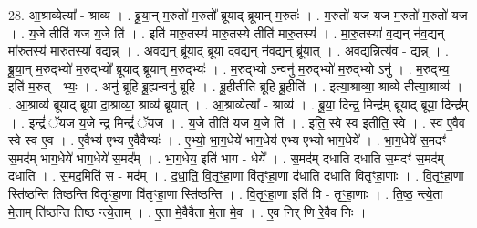 \documentclass[17pt]{extarticle}
\begin{document}
28. आ॒श्राव्येत्या᳚ - श्राव्य॑ । . ब्रू॒या॒न् म॒रुतो॑ म॒रुतो᳚ ब्रूयाद् ब्रूयान् म॒रुतः॑ । . म॒रुतो॑ यज यज म॒रुतो॑ म॒रुतो॑ यज । . य॒जे तीति॑ यज य॒जे ति॑ । . इति॑ मारु॒तस्य॑ मारु॒तस्ये तीति॑ मारु॒तस्य॑ । . मा॒रु॒तस्या॑ व॒द्यन् न॑व॒द्यन् मा॑रु॒तस्य॑ मारु॒तस्या॑ व॒द्यन्न् । . अ॒व॒द्यन् ब्रू॑याद् ब्रूया दव॒द्यन् न॑व॒द्यन् ब्रू॑यात् । . अ॒व॒द्यन्नित्य॑व - द्यन्न् । . ब्रू॒या॒न् म॒रुद्भ्यो॑ म॒रुद्भ्यो᳚ ब्रूयाद् ब्रूयान् म॒रुद्भ्यः॑ । . म॒रुद्भ्यो ऽन्वनु॑ म॒रुद्भ्यो॑ म॒रुद्भ्यो ऽनु॑ । . म॒रुद्भ्य॒ इति॑ म॒रुत् - भ्यः॒ । . अनु॑ ब्रूहि ब्रू॒ह्यन्वनु॑ ब्रूहि । . ब्रू॒हीतीति॑ ब्रूहि ब्रू॒हीति॑ । . इत्या॒श्राव्या॒ श्राव्ये तीत्या॒श्राव्य॑ । . आ॒श्राव्य॑ ब्रूयाद् ब्रूया दा॒श्राव्या॒ श्राव्य॑ ब्रूयात् । . आ॒श्राव्येत्या᳚ - श्राव्य॑ । . ब्रू॒या॒ दिन्द्र॒ मिन्द्र॑म् ब्रूयाद् ब्रूया॒ दिन्द्र᳚म् । . इन्द्रं॑ ॅयज य॒जे न्द्र॒ मिन्द्रं॑ ॅयज । . य॒जे तीति॑ यज य॒जे ति॑ । . इति॒ स्वे स्व इतीति॒ स्वे । . स्व ए॒वैव स्वे स्व ए॒व । . ए॒वैभ्य॑ एभ्य ए॒वैवैभ्यः॑ । . ए॒भ्यो॒ भा॒ग॒धेये॑ भाग॒धेय॑ एभ्य एभ्यो भाग॒धेये᳚ । . भा॒ग॒धेये॑ स॒मदꣳ॑ स॒मद॑म् भाग॒धेये॑ भाग॒धेये॑ स॒मद᳚म् । . भा॒ग॒धेय॒ इति॑ भाग - धेये᳚ । . स॒मद॑म् दधाति दधाति स॒मदꣳ॑ स॒मद॑म् दधाति । . स॒मद॒मिति॑ स - मद᳚म् । . द॒धा॒ति॒ वि॒तृꣳ॒॒हा॒णा वि॑तृꣳहा॒णा द॑धाति दधाति वितृꣳहा॒णाः । . वि॒तृꣳ॒॒हा॒णा स्ति॑ष्ठन्ति तिष्ठन्ति वितृꣳहा॒णा वि॑तृꣳहा॒णा स्ति॑ष्ठन्ति । . वि॒तृꣳ॒॒हा॒णा इति॑ वि - तृꣳ॒॒हा॒णाः । . ति॒ष्ठ॒ न्त्ये॒ता मे॒ताम् ति॑ष्ठन्ति तिष्ठ न्त्ये॒ताम् । . ए॒ता मे॒वैवैता मे॒ता मे॒व । . ए॒व निर् णि रे॒वैव निः । \newline
\end{document}
